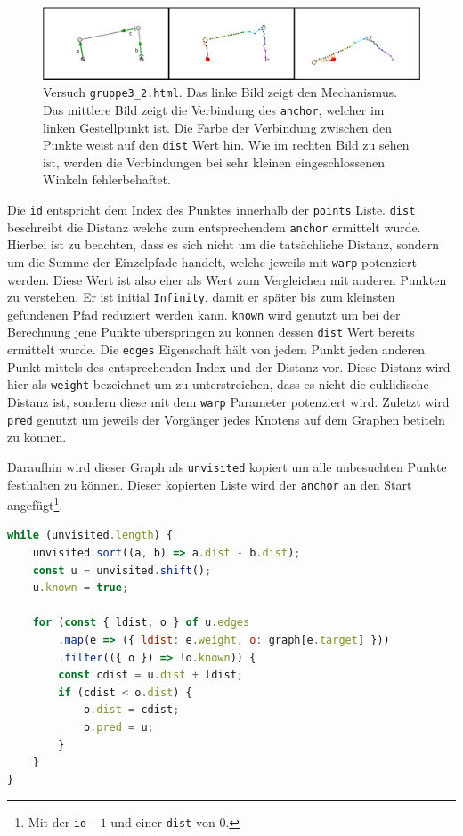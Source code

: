 \begin{figure}
    \centering
    \includegraphics[width=\textwidth]{gfx/dijkstra_edit.png}
    \caption[Versuch \lstinline{gruppe3_2.html}]{Versuch \lstinline{gruppe3_2.html}. Das linke Bild zeigt den Mechanismus. Das mittlere Bild zeigt die Verbindung des \lstinline{anchor}, welcher im linken Gestellpunkt ist. Die Farbe der Verbindung zwischen den Punkte weist auf den \lstinline{dist} Wert hin.
    Wie im rechten Bild zu sehen ist, werden die Verbindungen bei sehr kleinen eingeschlossenen Winkeln fehlerbehaftet.}
    \label{fig:gruppe3_1}
\end{figure}

Die \lstinline{id} entspricht dem Index des Punktes innerhalb der \lstinline{points} Liste.
\lstinline{dist} beschreibt die Distanz welche zum entsprechendem \lstinline{anchor} ermittelt wurde.
Hierbei ist zu beachten, dass es sich nicht um die tatsächliche Distanz, sondern um die Summe der Einzelpfade handelt, welche jeweils mit \lstinline{warp} potenziert werden.
Diese Wert ist also eher als Wert zum Vergleichen mit anderen Punkten zu verstehen.
Er ist initial \lstinline{Infinity}, damit er später bis zum kleinsten gefundenen Pfad reduziert werden kann.
\lstinline{known} wird genutzt um bei der Berechnung jene Punkte überspringen zu können dessen \lstinline{dist} Wert bereits ermittelt wurde.
Die \lstinline{edges} Eigenschaft hält von jedem Punkt jeden anderen Punkt mittels des entsprechenden Index und der Distanz vor.
Diese Distanz wird hier als \lstinline{weight} bezeichnet um zu unterstreichen, dass es nicht die euklidische Distanz ist, sondern diese mit dem \lstinline{warp} Parameter potenziert wird.
Zuletzt wird \lstinline{pred} genutzt um jeweils der Vorgänger jedes Knotens auf dem Graphen betiteln zu können.

Daraufhin wird dieser Graph als \lstinline{unvisited} kopiert um alle unbesuchten Punkte festhalten zu können.
Dieser kopierten Liste wird der \lstinline{anchor} an den Start angefügt\footnote{Mit der \lstinline{id} $-1$ und einer \lstinline{dist} von 0.}.

\begin{lstlisting}[language=JavaScript, caption={Berechnung der \lstinline{dist} Eigenschaft der einzelnen Objekte aus dem Dijkstra-Graphen.}, label={lst:creation_dijkstra_graph}]
while (unvisited.length) {
    unvisited.sort((a, b) => a.dist - b.dist);
    const u = unvisited.shift();
    u.known = true;

    for (const { ldist, o } of u.edges
        .map(e => ({ ldist: e.weight, o: graph[e.target] }))
        .filter(({ o }) => !o.known)) {
        const cdist = u.dist + ldist;
        if (cdist < o.dist) {
            o.dist = cdist;
            o.pred = u;
        }
    }
}
\end{lstlisting}

